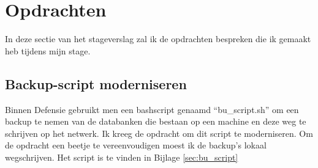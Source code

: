 

\section{Opdrachten}
\label{sec:opdrachten}

In deze sectie van het stageverslag zal ik de opdrachten bespreken die ik gemaakt heb tijdens mijn stage.

\subsection{Backup-script moderniseren}

Binnen Defensie gebruikt men een bashscript genaamd ``bu\_script.sh'' om een backup te nemen van de databanken die bestaan op een machine en deze weg te schrijven op het netwerk.  
Ik kreeg de opdracht om dit script te moderniseren. Om de opdracht een beetje te vereenvoudigen moest ik de backup's lokaal wegschrijven. Het script is te vinden in Bijlage \ref{sec:bu_script}

